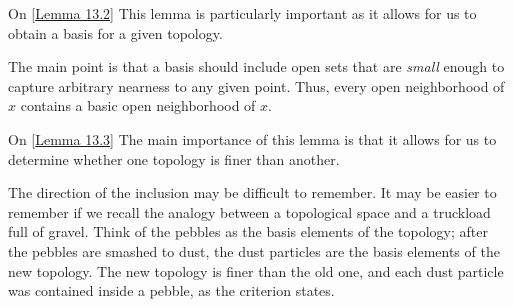 \begin{remarkBox}{On [\hyperlink{lem:13.2}{Lemma 13.2}]}
    This lemma is particularly important as it allows for us to obtain a basis 
    for a given topology.

    \baseSkip

    The main point is that a basis should include open sets that are 
    \textit{small} enough to capture arbitrary nearness to any given point.
    Thus, every open neighborhood of \( x \) contains a basic open
    neighborhood of \( x \).
\end{remarkBox}

\begin{remarkBox}{On [\hyperlink{lem:13.3}{Lemma 13.3}]}
    The main importance of this lemma is that it allows for us to determine 
    whether one topology is finer than another. 

    \baseSkip 

    The direction of the inclusion may be difficult to remember.
    It may be easier to remember if we recall the analogy between
    a topological space and a truckload full of gravel. 
    Think of the pebbles as the basis elements of the topology; 
    after the pebbles are smashed to dust, the dust particles are
    the basis elements of the new topology. 
    The new topology is finer than the old one, and each dust particle was 
    contained inside a pebble, as the criterion states.
\end{remarkBox}